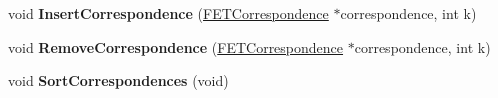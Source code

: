 \begin{DoxyCompactItemize}
\item 
void {\bfseries Insert\+Correspondence} (\hyperlink{struct_f_e_t_correspondence}{F\+E\+T\+Correspondence} $\ast$correspondence, int k)\hypertarget{struct_f_e_t_feature_ae44cf98a543993d02adba2ba96317d25}{}\label{struct_f_e_t_feature_ae44cf98a543993d02adba2ba96317d25}

\item 
void {\bfseries Remove\+Correspondence} (\hyperlink{struct_f_e_t_correspondence}{F\+E\+T\+Correspondence} $\ast$correspondence, int k)\hypertarget{struct_f_e_t_feature_ac23a19bfec374e95d1fa02c6647ed1eb}{}\label{struct_f_e_t_feature_ac23a19bfec374e95d1fa02c6647ed1eb}

\item 
void {\bfseries Sort\+Correspondences} (void)\hypertarget{struct_f_e_t_feature_abfe832379d77144da5c4b82affb51dd8}{}\label{struct_f_e_t_feature_abfe832379d77144da5c4b82affb51dd8}

\end{DoxyCompactItemize}
